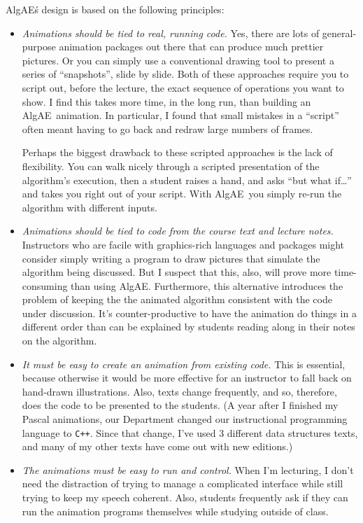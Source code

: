 \documentclass[11pt,titlepage]{book}
\newcommand{\algae}{{\sc AlgAE}}
\newcommand{\cpp}{{\tt C++}}
\begin{document}
\algae\'s design is based on the following principles:
\begin{itemize} 
\item[] {\em Animations should be tied to real, running code.} Yes,
there are lots of general-purpose animation packages out there that
can produce much prettier pictures. Or you can simply use a
conventional drawing tool to present a series of ``snapshots'', slide
by slide.  Both of these approaches require you to script out, before
the lecture, the exact sequence of operations you want to show. I find
this takes more time, in the long run, than building an \algae\
animation. In particular, I found that small mistakes in a ``script''
often meant having to go back and redraw large numbers of frames.

Perhaps the biggest drawback to these scripted approaches is the lack
of flexibility.  You can walk nicely through a scripted presentation
of the algorithm's execution, then a student raises a hand, and asks
``but what if\ldots'' and takes you right out of your script. With
\algae\, you simply re-run the algorithm with different inputs.


\item[] {\em Animations should be tied to code from the course text
and lecture notes.}  Instructors who are facile with graphics-rich
languages and packages might consider simply writing a program to draw
pictures that simulate the algorithm being discussed. But I suspect
that this, also, will prove more time-consuming than using
\algae. Furthermore, this alternative introduces the problem of
keeping the the animated algorithm consistent with the code under
discussion.  It's counter-productive to have the animation do things
in a different order than can be explained by students reading along
in their notes on the algorithm.

\item[] {\em It must be easy to create an animation from existing
code.} This is essential, because otherwise it would be more effective
for an instructor to fall back on hand-drawn illustrations. 
Also, texts change frequently, and so, therefore, does the code to be
presented to the students. (A year
after I finished my Pascal animations, our Department changed our
instructional programming language to \cpp. Since that change, I've
used 3 different data structures texts, and many of my other texts
have come out with new editions.) 

\item[] {\em The animations must be easy to run and control.} When I'm
lecturing, I don't need the distraction of trying to manage a
complicated interface while still trying to keep my speech coherent. 
Also, students frequently ask if they can run the animation programs
themselves while studying outside of class.


\end{itemize}
\end{document}
